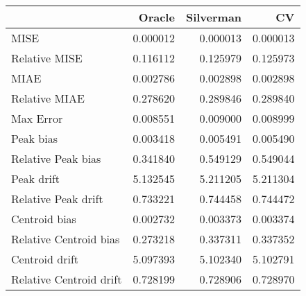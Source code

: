 \begin{tabular}{lrrr}
  \hline
 & Oracle & Silverman & CV \\ 
  \hline
MISE & 0.000012 & 0.000013 & 0.000013 \\ 
  Relative MISE & 0.116112 & 0.125979 & 0.125973 \\ 
  MIAE & 0.002786 & 0.002898 & 0.002898 \\ 
  Relative MIAE & 0.278620 & 0.289846 & 0.289840 \\ 
  Max Error & 0.008551 & 0.009000 & 0.008999 \\ 
  Peak bias & 0.003418 & 0.005491 & 0.005490 \\ 
  Relative Peak bias & 0.341840 & 0.549129 & 0.549044 \\ 
  Peak drift & 5.132545 & 5.211205 & 5.211304 \\ 
  Relative Peak drift & 0.733221 & 0.744458 & 0.744472 \\ 
  Centroid bias & 0.002732 & 0.003373 & 0.003374 \\ 
  Relative Centroid bias & 0.273218 & 0.337311 & 0.337352 \\ 
  Centroid drift & 5.097393 & 5.102340 & 5.102791 \\ 
  Relative Centroid drift & 0.728199 & 0.728906 & 0.728970 \\ 
   \hline
\end{tabular}
